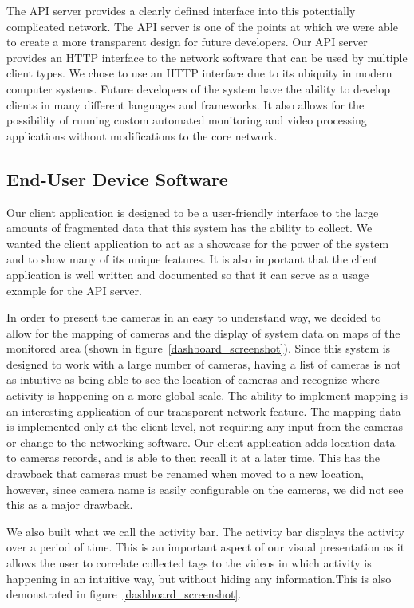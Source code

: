 The API server provides a clearly defined interface into this potentially
complicated network. The API server is one of the points at which we were able
to create a more transparent design for future developers. Our API server
provides an HTTP interface to the network software that can be used by multiple
client types. We chose to use an HTTP interface due to its ubiquity in modern
computer systems. Future developers of the system have the ability to develop
clients in many different languages and frameworks. It also allows for the
possibility of running custom automated monitoring and video processing
applications without modifications to the core network.

\subsection{End-User Device Software}


Our client application is designed to be a user-friendly interface to the large
amounts of fragmented data that this system has the ability to collect. We
wanted the client application to act as a showcase for the power of the system
and to show many of its unique features. It is also important that the client
application is well written and documented so that it can serve as a usage
example for the API server.

In order to present the cameras in an easy to understand way, we decided to
allow for the mapping of cameras and the display of system data on maps of the
monitored area (shown in figure~\ref{dashboard_screenshot}). Since this system
is designed to work with a large number of cameras, having a list of cameras is
not as intuitive as being able to see the location of cameras and recognize
where activity is happening on a more global scale. The ability to implement
mapping is an interesting application of our transparent network feature. The
mapping data is implemented only at the client level, not requiring any input
from the cameras or change to the networking software. Our client application
adds location data to cameras records, and is able to then recall it at a later
time.  This has the drawback that cameras must be renamed when moved to a new
location, however, since camera name is easily configurable on the cameras, we
did not see this as a major drawback.

We also built what we call the activity bar. The activity bar displays the
activity over a period of time. This is an important aspect of our visual
presentation as it allows the user to correlate collected tags to the videos in
which activity is happening in an intuitive way, but without hiding any
information.This is also demonstrated in figure~\ref{dashboard_screenshot}.

